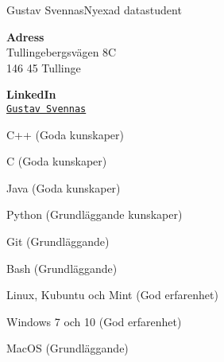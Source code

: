 \documentclass{article}
\begin{document}
\begin{cv}[avatar]{Gustav Svennas}{Nyexad datastudent}
\cvseparator[3]
\begin{cvitem}[Home][4]
    \textbf{Adress}\\
    Tullingebergsvägen 8C\\ 146 45 Tullinge
\end{cvitem}

\cvseparator[3]
\begin{cvitem}[Globe][4]
    \textbf{LinkedIn}\\
    \href{https://www.linkedin.com/in/gustav-svennas-18b575159}{\texttt{Gustav Svennas}}
\end{cvitem}



\begin{cvitem}
    C++ (Goda kunskaper)
\end{cvitem}

\begin{cvitem}
    C (Goda kunskaper)
\end{cvitem}

\begin{cvitem}
    Java (Goda kunskaper)
\end{cvitem}

\begin{cvitem}
    Python (Grundläggande kunskaper)
\end{cvitem}


\cvseparator
\begin{cvitem}
    Git (Grundläggande)
\end{cvitem}

\cvseparator
\begin{cvitem}
    Bash (Grundläggande)
\end{cvitem}

\cvseparator
\begin{cvitem}
    Linux, Kubuntu och Mint (God erfarenhet)
\end{cvitem}

\cvseparator
\begin{cvitem}
    Windows 7 och 10 (God erfarenhet)
\end{cvitem}

\cvseparator
\begin{cvitem}
    MacOS (Grundläggande)
\end{cvitem}


\end{cv}
\end{document}
